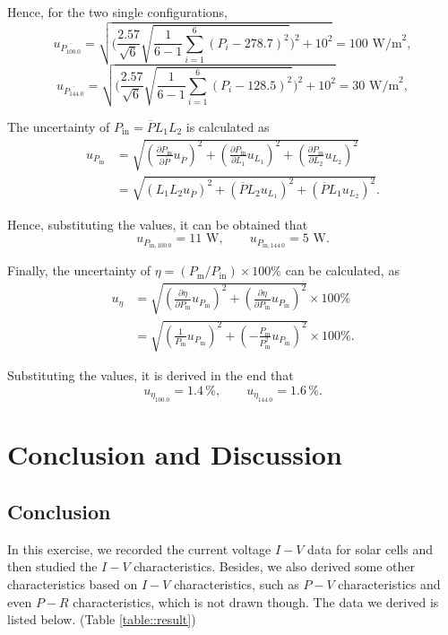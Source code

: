 \documentclass[a4paper]{article}
\begin{document}
Hence, for the two single configurations,
$$u_{\overline{P_{100.0}}} = \sqrt{\bigg(\frac{2.57}{\sqrt{6}}\sqrt{\frac{1}{6-1}\sum \limits_{i=1}^{6}(P_i-278.7)^2}\bigg)^2+10^2} = 100\,\,\text{W/m}^2,$$
$$u_{\overline{P_{144.0}}} = \sqrt{\bigg(\frac{2.57}{\sqrt{6}}\sqrt{\frac{1}{6-1}\sum \limits_{i=1}^{6}(P_i-128.5)^2}\bigg)^2+10^2} = 30\,\,\text{W/m}^2,$$

The uncertainty of $P_\text{in} = \overline{P}L_1L_2$ is calculated as
\begin{align*}
	u_{P_\text{in}} & = \sqrt{(\frac{\partial P_{\text{in}}}{\partial \overline{P}}u_{\overline{P}})^2 + (\frac{\partial P_{\text{in}}}{\partial L_1}u_{L_1})^2 + (\frac{\partial P_\text{in}}{\partial L_2}u_{L_2})^2} \\
	                & = \sqrt{(L_1L_2u_{\overline{P}})^2 + (\overline{P}L_2u_{L_1})^2 + (\overline{P}L_1u_{L_2})^2}.
\end{align*}

Hence, substituting the values, it can be obtained that
$$u_{P_{\text{in},100.0}} = 11\,\,\text{W},\hspace{2em}u_{P_{\text{in},144.0}} = 5\,\,\text{W}.$$

Finally, the uncertainty of $\eta = (P_{\text{m}}/P_\text{in})\times 100\%$ can be calculated, as
\begin{align*}
	u_\eta & = \sqrt{(\frac{\partial \eta}{\partial P_\text{m}}u_{P_\text{m}})^2 + (\frac{\partial \eta}{\partial P_\text{in}}u_{P_\text{in}})^2} \times 100\% \\
	       & = \sqrt{(\frac{1}{P_\text{in}}u_{P_\text{m}})^2 + (-\frac{P_{\text{m}}}{P_{\text{in}}^2}u_{P_\text{in}})^2} \times 100\%.
\end{align*}

Substituting the values, it is derived in the end that
$$u_{\eta_{100.0}} = 1.4\,\%,\hspace{2em}u_{\eta_{144.0}} = 1.6\,\%.$$

\section{Conclusion and Discussion}

\subsection{Conclusion}

In this exercise, we recorded the current voltage $I-V$ data for solar cells and then studied the $I-V$ characteristics.
Besides, we also derived some other characteristics based on $I-V$ characteristics, such as $P-V$ characteristics and even $P-R$ characteristics, which is not drawn though.
The data we derived is listed below. (Table \ref{table::result})
\end{document}
